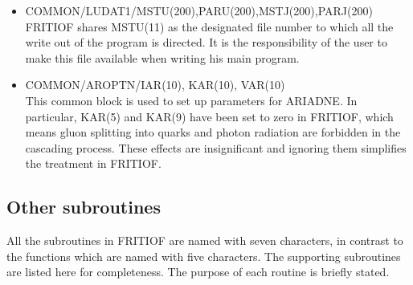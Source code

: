 \begin{itemize} 
\item{COMMON/LUDAT1/MSTU(200),PARU(200),MSTJ(200),PARJ(200)}\\
FRITIOF shares MSTU(11) as the designated file number to which all 
the write out of the program is directed.  It is the responsibility of 
the user to make this file available when writing his main program. \\ 

\item{COMMON/AROPTN/IAR(10), KAR(10), VAR(10)}\\
This common block is used to set up parameters for ARIADNE.  In particular, 
KAR(5) and KAR(9) have been set to zero in FRITIOF, which means 
gluon splitting into quarks and photon radiation are forbidden 
in the cascading process.  These effects are insignificant and ignoring them
simplifies the treatment in FRITIOF.  
\end{itemize} 



\subsection{Other subroutines}

All the subroutines in FRITIOF are named with seven characters, 
in contrast to the functions which are named with five characters.    
The supporting subroutines are listed here for completeness.
The purpose of each routine is briefly stated.  

